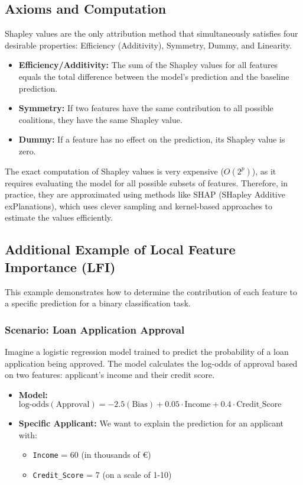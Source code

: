\documentclass{article}
\begin{document}
\begin{multicols}{2}
\subsection{Axioms and Computation}
Shapley values are the only attribution method that simultaneously satisfies four desirable properties: Efficiency (Additivity), Symmetry, Dummy, and Linearity.
\begin{itemize}
    \item \textbf{Efficiency/Additivity:} The sum of the Shapley values for all features equals the total difference between the model's prediction and the baseline prediction.
    \item \textbf{Symmetry:} If two features have the same contribution to all possible coalitions, they have the same Shapley value.
    \item \textbf{Dummy:} If a feature has no effect on the prediction, its Shapley value is zero.
\end{itemize}
The exact computation of Shapley values is very expensive ($O(2^p)$), as it requires evaluating the model for all possible subsets of features. Therefore, in practice, they are approximated using methods like SHAP (SHapley Additive exPlanations), which uses clever sampling and kernel-based approaches to estimate the values efficiently.



\subsection{Additional Example of Local Feature Importance (LFI)}

This example demonstrates how to determine the contribution of each feature to a specific prediction for a binary classification task.

\subsubsection{Scenario: Loan Application Approval}

Imagine a logistic regression model trained to predict the probability of a loan application being approved. The model calculates the log-odds of approval based on two features: applicant's income and their credit score.

\begin{itemize}
    \item \textbf{Model:} $\text{log-odds}(\text{Approval}) = -2.5 (\text{Bias}) + 0.05 \cdot \text{Income} + 0.4 \cdot \text{Credit\_Score}$
    \item \textbf{Specific Applicant:} We want to explain the prediction for an applicant with:
    \begin{itemize}
        \item \texttt{Income} = 60 (in thousands of €)
        \item \texttt{Credit\_Score} = 7 (on a scale of 1-10)
    \end{itemize}
\end{itemize}


\end{multicols}
\end{document}
